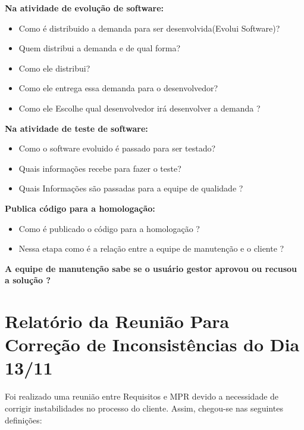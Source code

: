 \textbf{Na atividade de evolução de software:}
\begin{itemize}
	\item Como é distribuido a demanda para ser desenvolvida(Evolui Software)?  
	\item Quem distribui a demanda e de qual forma?
	\item Como ele distribui?
	\item Como ele entrega essa demanda para o desenvolvedor?
	\item Como ele Escolhe qual desenvolvedor irá desenvolver a demanda ? 
\end{itemize}

\textbf{Na atividade de teste de software:}
\begin{itemize}
	\item Como o software evoluido é passado para ser testado?  
	\item Quais informações recebe para fazer o teste? 
	\item Quais Informações são passadas para a equipe de qualidade ?
\end{itemize}

\textbf{Publica código para a homologação:}
\begin{itemize}
	\item Como é publicado o código para a homologação ?
	\item Nessa etapa como é a relação entre a equipe de manutenção e o cliente ? 
\end{itemize}

\textbf{A equipe de manutenção sabe se o usuário gestor aprovou ou recusou a solução ?}

\section{Relatório da Reunião Para Correção de Inconsistências do Dia 13/11}

Foi realizado uma reunião entre Requisitos e MPR devido a necessidade de corrigir instabilidades no processo do cliente. Assim, chegou-se nas seguintes definições:

